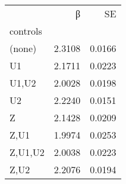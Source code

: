 \begin{tabular}{lrr}
\toprule
 & β & SE \\
controls &  &  \\
\midrule
(none) & 2.3108 & 0.0166 \\
U1 & 2.1711 & 0.0223 \\
U1,U2 & 2.0028 & 0.0198 \\
U2 & 2.2240 & 0.0151 \\
Z & 2.1428 & 0.0209 \\
Z,U1 & 1.9974 & 0.0253 \\
Z,U1,U2 & 2.0038 & 0.0223 \\
Z,U2 & 2.2076 & 0.0194 \\
\bottomrule
\end{tabular}
